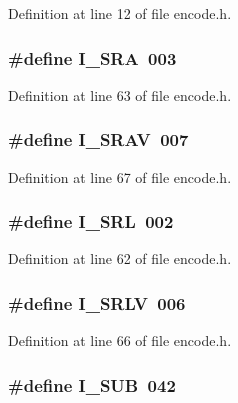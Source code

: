 Definition at line 12 of file encode.\+h.

\subsubsection[{I\+\_\+\+S\+RA}]{\setlength{\rightskip}{0pt plus 5cm}\#define I\+\_\+\+S\+RA~003}\label{encode_8h_a9aae760b6b6f94420b63da7924412235}


Definition at line 63 of file encode.\+h.

\subsubsection[{I\+\_\+\+S\+R\+AV}]{\setlength{\rightskip}{0pt plus 5cm}\#define I\+\_\+\+S\+R\+AV~007}\label{encode_8h_a05bf4baf3f62cfd6fdca42acfb09e99f}


Definition at line 67 of file encode.\+h.

\subsubsection[{I\+\_\+\+S\+RL}]{\setlength{\rightskip}{0pt plus 5cm}\#define I\+\_\+\+S\+RL~002}\label{encode_8h_ae7bf2aadcea08d1b03d341755111ab72}


Definition at line 62 of file encode.\+h.

\subsubsection[{I\+\_\+\+S\+R\+LV}]{\setlength{\rightskip}{0pt plus 5cm}\#define I\+\_\+\+S\+R\+LV~006}\label{encode_8h_aa4c892b659632e4017674236ddbd045c}


Definition at line 66 of file encode.\+h.

\subsubsection[{I\+\_\+\+S\+UB}]{\setlength{\rightskip}{0pt plus 5cm}\#define I\+\_\+\+S\+UB~042}\label{encode_8h_a62d6257ade845a52f546440e40e1041d}


